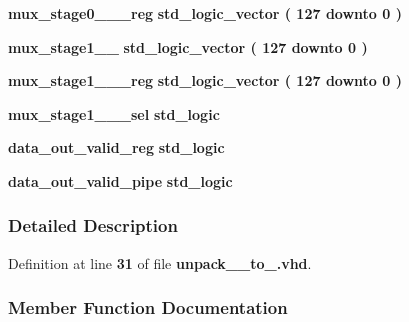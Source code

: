 \begin{DoxyCompactItemize}
\item 
{\bf mux\+\_\+stage0\+\_\+\_\+\_\+reg} {\bfseries \textcolor{comment}{std\+\_\+logic\+\_\+vector}\textcolor{vhdlchar}{ }\textcolor{vhdlchar}{(}\textcolor{vhdlchar}{ }\textcolor{vhdlchar}{ } \textcolor{vhdldigit}{127} \textcolor{vhdlchar}{ }\textcolor{keywordflow}{downto}\textcolor{vhdlchar}{ }\textcolor{vhdlchar}{ } \textcolor{vhdldigit}{0} \textcolor{vhdlchar}{ }\textcolor{vhdlchar}{)}\textcolor{vhdlchar}{ }} 
\item 
{\bf mux\+\_\+stage1\+\_\+\_} {\bfseries \textcolor{comment}{std\+\_\+logic\+\_\+vector}\textcolor{vhdlchar}{ }\textcolor{vhdlchar}{(}\textcolor{vhdlchar}{ }\textcolor{vhdlchar}{ } \textcolor{vhdldigit}{127} \textcolor{vhdlchar}{ }\textcolor{keywordflow}{downto}\textcolor{vhdlchar}{ }\textcolor{vhdlchar}{ } \textcolor{vhdldigit}{0} \textcolor{vhdlchar}{ }\textcolor{vhdlchar}{)}\textcolor{vhdlchar}{ }} 
\item 
{\bf mux\+\_\+stage1\+\_\+\_\+\_\+reg} {\bfseries \textcolor{comment}{std\+\_\+logic\+\_\+vector}\textcolor{vhdlchar}{ }\textcolor{vhdlchar}{(}\textcolor{vhdlchar}{ }\textcolor{vhdlchar}{ } \textcolor{vhdldigit}{127} \textcolor{vhdlchar}{ }\textcolor{keywordflow}{downto}\textcolor{vhdlchar}{ }\textcolor{vhdlchar}{ } \textcolor{vhdldigit}{0} \textcolor{vhdlchar}{ }\textcolor{vhdlchar}{)}\textcolor{vhdlchar}{ }} 
\item 
{\bf mux\+\_\+stage1\+\_\+\_\+\_\+sel} {\bfseries \textcolor{comment}{std\+\_\+logic}\textcolor{vhdlchar}{ }} 
\item 
{\bf data\+\_\+out\+\_\+valid\+\_\+reg} {\bfseries \textcolor{comment}{std\+\_\+logic}\textcolor{vhdlchar}{ }} 
\item 
{\bf data\+\_\+out\+\_\+valid\+\_\+pipe} {\bfseries \textcolor{comment}{std\+\_\+logic}\textcolor{vhdlchar}{ }} 
\end{DoxyCompactItemize}


\subsubsection{Detailed Description}


Definition at line {\bf 31} of file {\bf unpack\+\_\+\_\+to\+\_.\+vhd}.



\subsubsection{Member Function Documentation}
